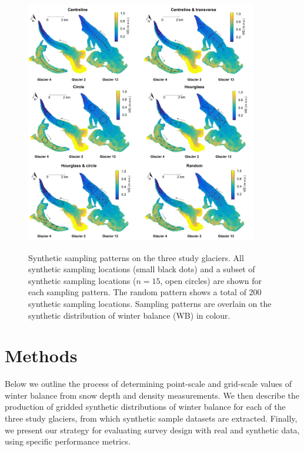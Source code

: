 \documentclass[twocolumn,letterpaper]{igs}
\begin{document}
\begin{figure}
	\centering
	\includegraphics[width =0.9\textwidth]{Pulwicki_Fig2.pdf}\\
	\caption{Synthetic sampling patterns on the three study glaciers. All synthetic sampling locations (small black dots) and a subset of synthetic sampling locations ($n=15$, open circles) are shown for each sampling pattern. The random pattern shows a total of 200 synthetic sampling locations. Sampling patterns are overlain on the synthetic distribution of winter balance (WB) in colour. } 
       \label{fig:SyntheticSampleDesign}
\end{figure}

\section{Methods}

Below we outline the process of determining point-scale and grid-scale values of winter balance from snow depth and density measurements. We then describe the production of gridded synthetic distributions of winter balance for each of the three study glaciers, from which synthetic sample datasets are extracted. Finally, we present our strategy for evaluating survey design with real and synthetic data, using specific performance metrics. 
\end{document}
